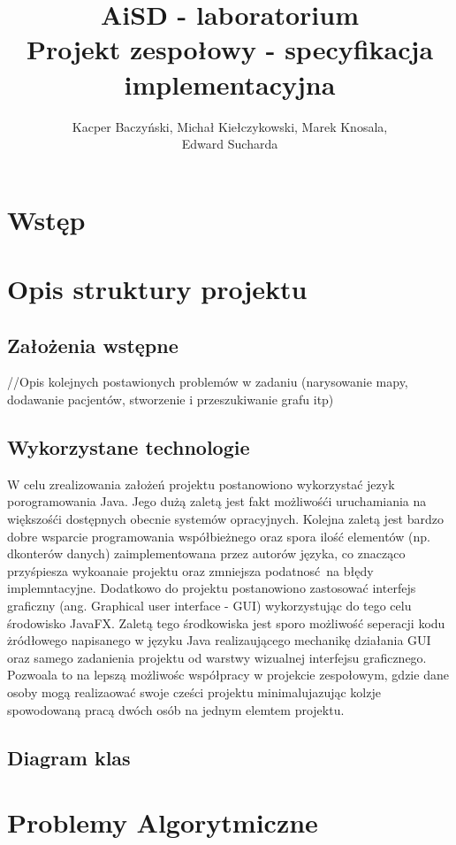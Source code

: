 \documentclass[10pt,a4paper]{article}
\title{\huge AiSD - laboratorium \\ \Large Projekt zespołowy - specyfikacja implementacyjna}
\author{Kacper Baczyński, Michał Kiełczykowski, Marek Knosala, \\ Edward Sucharda}
\begin{document}
\maketitle

\section{Wstęp}

\section{Opis struktury projektu}

\subsection{Założenia wstępne}

//Opis kolejnych postawionych problemów w zadaniu (narysowanie mapy, dodawanie pacjentów, stworzenie i przeszukiwanie grafu itp)

\subsection{Wykorzystane technologie}

W celu zrealizowania założeń projektu postanowiono wykorzystać jezyk porogramowania Java. Jego dużą zaletą jest fakt możliwośći uruchamiania na większośći dostępnych obecnie systemów opracyjnych. Kolejna zaletą jest bardzo dobre wsparcie 
programowania współbieżnego oraz spora ilość elementów (np. dkonterów danych) zaimplementowana przez autorów języka, co znacząco przyśpiesza wykoanaie projektu oraz zmniejsza podatnosć na błędy implemntacyjne. 
Dodatkowo do projektu postanowiono zastosować interfejs graficzny (ang. Graphical user interface - GUI) wykorzystując do tego celu środowisko JavaFX. Zaletą tego środkowiska jest sporo możliwość seperacji kodu żródłowego napisanego w języku Java 
realizaującego mechanikę działania GUI oraz samego zadanienia projektu od warstwy wizualnej interfejsu graficznego. Pozwoala to na lepszą możliwośc współpracy w projekcie zespołowym, gdzie dane osoby mogą realizaować swoje cześci projektu 
minimalujazując kolzje spowodowaną pracą dwóch osób na jednym elemtem projektu. 

\subsection{Diagram klas}

\section{Problemy Algorytmiczne}
\end{document}
